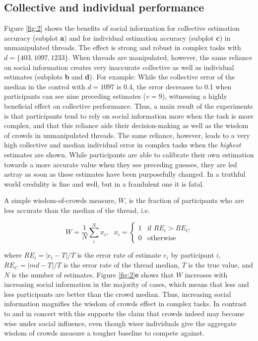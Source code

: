 \documentclass[10pt,a4paper,twocolumn,lineno]{article}
\begin{document}
\subsection{Collective and individual performance}
Figure \ref{fig:2} shows the benefits of social information for collective estimation accuracy (subplot \textbf{a}) and for individual estimation accuracy (subplot \textbf{c}) in unmanipulated threads. The effect is strong and robust in complex tasks with $d=\{403, 1097, 1233\}$. When threads are manipulated, however, the same reliance on social information creates very inaccurate collective as well as individual estimates (subplots \textbf{b} and \textbf{d}). For example: While the collective error of the median in the control with $d=1097$ is 0.4, the error decreases to 0.1 when participants can see nine preceding estimates ($v=9$), witnessing a highly beneficial effect on collective performance. Thus, a main result of the experiments is that participants tend to rely on social information more when the task is more complex, and that this reliance aids their decision-making as well as the wisdom of crowds in unmanipulated threads. The same reliance, however, leads to a very high collective and median individual error in complex tasks when the \textit{highest} estimates are shown. While participants are able to calibrate their own estimation towards a more accurate value when they see preceding guesses, they are led astray as soon as these estimates have been purposefully changed. In a truthful world credulity is fine and well, but in a fraudulent one it is fatal.

A simple wisdom-of-crowds measure, $W$, is the fraction of participants who are less accurate than the median of the thread, i.e. 

$$
W=\frac{1}{N} \sum_i^N x_i, \text{ } x_i=
\begin{cases}
  1 & \text{if } RE_i > RE_C \\    
  0 & \text{otherwise }
\end{cases}
$$

\noindent
where $RE_i = |e_i-T|/T$ is the error rate of estimate $e_i$ by participant $i$, $RE_C = |md-T|/T$ is the error rate of the thread median, $T$ is the true value, and $N$ is the number of estimates. Figure \ref{fig:2}\textbf{e} shows that $W$ increases with increasing social information in the majority of cases, which means that less and less participants are better than the crowd median. Thus, increasing social information magnifies the wisdom of crowds effect in complex tasks. In contrast to \cite{lorenz2011social} and in concert with \cite{becker2017network, farrell2011social} this supports the claim that crowds indeed may become wise under social influence, even though wiser individuals give the aggregate wisdom of crowds measure a tougher baseline to compete against. 
\end{document}
